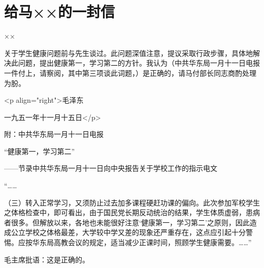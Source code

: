 \section[给马××的一封信（一九五一年十一月十五日）]{给马××的一封信}


××

关于学生健康问题前与先生谈过。此问题深值注意，提议采取行政步骤，具体地解决此问题，提出健康第一，学习第二的方针。我认为（中共华东局一月十一日电报一件付上，请察阅，其中第三项谈此词题，）是正确的，请马付部长同志商酌处理为朌。

<p align="right">毛泽东

一九五一年十一月十五日</p>

附：中共华东局一月十一日电报

“健康第一，学习第二”

——节录中共华东局一月十一日向中央报告关于学校工作的指示电文

“……

（三）转入正常学习，又须防止过去加多课程硬赶功课的偏向。此次参加军校学生之体格检查中，即可看出，由于国民党长期反动统治的结果，学生体质虚弱，患病者很多。但解放以来，各地也未能很好注意‘健康第一，学习第二’之原则，因此造成公立学校之体格最差，大学较中学又差的现象还严重存在，这点应引起十分警惕。应按华东局高教会议的规定，适当减少正课时间，照顾学生健康需要。……”

毛主席批语：这是正确的。


